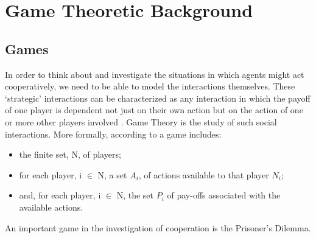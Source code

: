 \documentclass[11pt]{book}
\begin{document}
\section{Game Theoretic Background}\label{game_theoretic_background}
\subsection{Games}\label{games}
In order to think about and investigate the situations in which agents might act cooperatively, we need to be able to
model the interactions themselves. These `strategic' interactions can be characterized as any interaction in which the
payoff of one player is dependent not just on their own action but on the action of one or more other players involved \citep{angner_course_2012}. Game Theory is the study of such social interactions. More formally, according to
\citet{osborne_course_1994} a game includes:
\begin{itemize}
	\item the finite set, N, of players;
	\item for each player, i $\in$ N, a set $A_i$, of actions available to that
	player $N_i$;
	\item and, for each player, i $\in$ N, the set $P_i$ of pay-offs associated
	with the available actions.
\end{itemize}
An important game in the investigation of cooperation is the Prisoner's Dilemma. 
\end{document}
